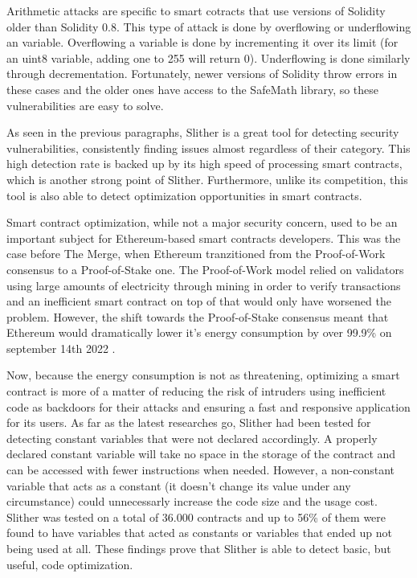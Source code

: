 Arithmetic attacks \cite{arithmeticAttack} are specific to smart cotracts that use versions of Solidity older than Solidity 0.8. This type of attack is done by overflowing or underflowing an variable. Overflowing a variable is done by incrementing it over its limit (for an uint8 variable, adding one to 255 will return 0). Underflowing is done similarly through decrementation. Fortunately, newer versions of Solidity throw errors in these cases and the older ones have access to the SafeMath library, so these vulnerabilities are easy to solve.

As seen in the previous paragraphs, Slither is a great tool for detecting security vulnerabilities, consistently finding issues almost regardless of their category. This high detection rate is backed up by its high speed of processing smart contracts, which is another strong point of Slither. Furthermore, unlike its competition, this tool is also able to detect optimization opportunities in smart contracts.

Smart contract optimization, while not a major security concern, used to be an important subject for Ethereum-based smart contracts developers. This was the case before The Merge, when Ethereum tranzitioned from the Proof-of-Work consensus to a Proof-of-Stake one. The Proof-of-Work model relied on validators using large amounts of electricity through mining in order to verify transactions and an inefficient smart contract on top of that would only have worsened the problem. However, the shift towards the Proof-of-Stake consensus meant that Ethereum would dramatically lower it's energy consumption by over 99.9\% on september 14th 2022 \cite{ethereumLowerElectricity}.

Now, because the energy consumption is not as threatening, optimizing a smart contract is more of a matter of reducing the risk of intruders using inefficient code as backdoors for their attacks and ensuring a fast and responsive application for its users. As far as the latest researches go, Slither \cite{slither} had been tested for detecting constant variables that were not declared accordingly. A properly declared constant variable will take no space in the storage of the contract and can be accessed with fewer instructions when needed. However, a non-constant variable that acts as a constant (it doesn't change its value under any circumstance) could unnecessarly increase the code size and the usage cost. Slither was tested on a total of 36.000 contracts and up to 56\% of them were found to have variables that acted as constants or variables that ended up not being used at all. These findings prove that Slither is able to detect basic, but useful, code optimization.

